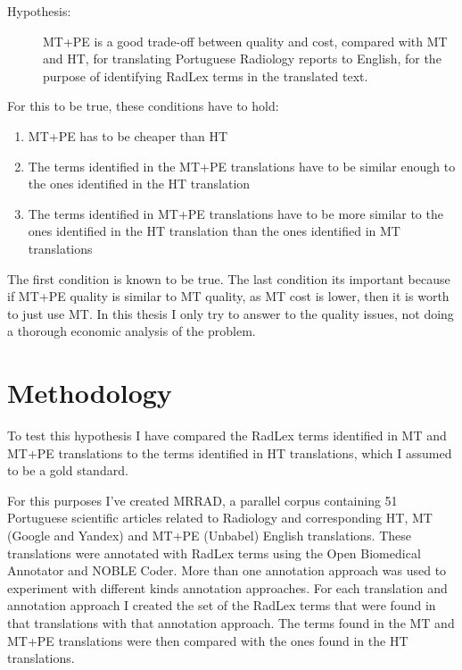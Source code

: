 \newcommand{\hypothesis}{
\begin{description}
	\item[Hypothesis:] MT+PE is a good trade-off between quality and cost, compared with MT and HT, for translating Portuguese Radiology reports to English, for the purpose of identifying RadLex terms in the translated text. 
\end{description}
}
\hypothesis

For this to be true, these conditions have to hold:

\begin{enumerate}
	\item MT+PE has to be cheaper than HT
	\item The terms identified in the MT+PE translations have to be similar enough to the ones identified in the HT translation
	\item The terms identified in MT+PE translations have to be more similar to the ones identified in the HT translation than the ones identified in MT translations
\end{enumerate}

The first condition is known to be true. The last condition its important because if MT+PE quality is similar to MT quality, as MT cost is lower, then it is worth to just use MT. In this thesis I only try to answer to the quality issues, not doing a thorough economic analysis of the problem. 

\section{Methodology}

To test this hypothesis I have compared the RadLex terms identified in MT and MT+PE translations to the terms identified in HT translations, which I assumed to be a gold standard.

For this purposes I've created MRRAD, a parallel corpus containing 51 Portuguese scientific articles related to Radiology and corresponding HT, MT (Google and Yandex) and MT+PE (Unbabel) English translations. These translations were annotated with RadLex terms using the Open Biomedical Annotator and NOBLE Coder. More than one annotation approach was used to experiment with different kinds annotation approaches. For each translation and annotation approach I created the set of the RadLex terms that were found in that translations with that annotation approach. The terms found in the MT and MT+PE translations were then compared with the ones found in the HT translations.

